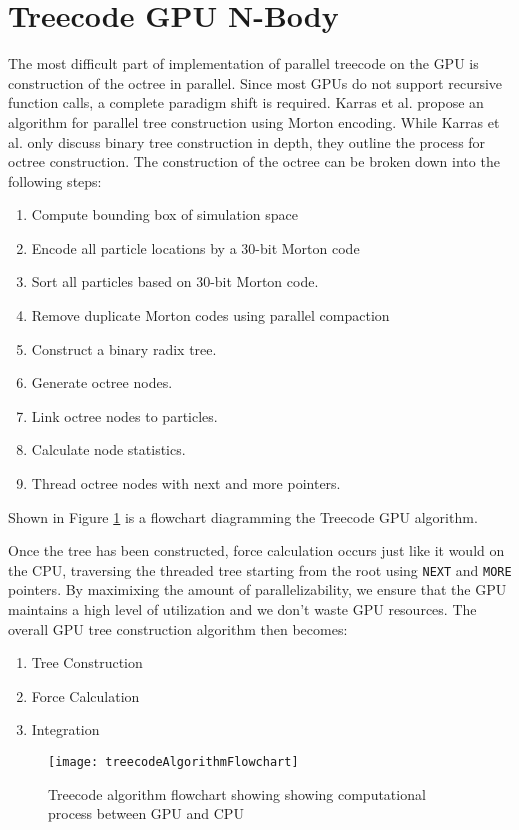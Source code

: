 \documentclass{thesis}
\begin{document}
\section{Treecode GPU N-Body}
The most difficult part of implementation of parallel treecode on the GPU is construction of the octree in parallel. Since most GPUs do not support recursive function calls, a complete paradigm shift is required. Karras et al. propose an algorithm for parallel tree construction using Morton encoding. While Karras et al. only discuss binary tree construction in depth, they outline the process for octree construction. The construction of the octree can be broken down into the following steps:
\begin{enumerate}[noitemsep]
    \item Compute bounding box of simulation space
    \item Encode all particle locations by a 30-bit Morton code
    \item Sort all particles based on 30-bit Morton code.
    \item Remove duplicate Morton codes using parallel compaction
    \item Construct a binary radix tree.
    \item Generate octree nodes.
    \item Link octree nodes to particles.
    \item Calculate node statistics.
    \item Thread octree nodes with next and more pointers.
\end{enumerate}
Shown in Figure \ref{fig:GPUTreecodeAlg} is a flowchart diagramming the Treecode GPU algorithm.

Once the tree has been constructed, force calculation occurs just like it would on the CPU, traversing the threaded tree starting from the root using \texttt{NEXT} and \texttt{MORE} pointers. By maximixing the amount of parallelizability, we ensure that the GPU maintains a high level of utilization and we don't waste GPU resources. The overall GPU tree construction algorithm then becomes:
\begin{enumerate}[noitemsep]
    \item Tree Construction
    \item Force Calculation
    \item Integration
\end{enumerate}
\begin{figure}[h]
    \caption{Treecode algorithm flowchart showing showing computational process between GPU and CPU}
    \label{fig:GPUTreecodeAlg}
    \centering
    \texttt{[image: treecodeAlgorithmFlowchart]}
\end{figure}
\end{document}
